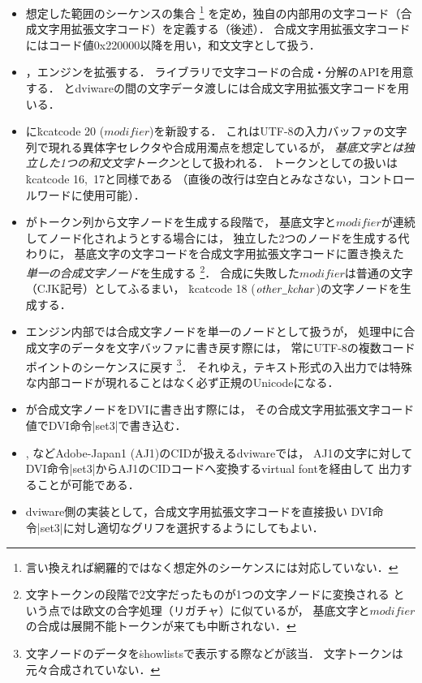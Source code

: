 \documentclass[a4paper,11pt,nomag,dvipdfmx]{jsarticle}
\def\_{\leavevmode\vrule width .45em height -.2ex depth .3ex\relax}
\begin{document}
\begin{itemize}
 \item 想定した範囲のシーケンスの集合%
   \footnote{言い換えれば網羅的ではなく想定外のシーケンスには対応していない．}%
   を定め，\upTeX 独自の内部用の文字コード（合成文字用拡張文字コード）を定義する（後述）．
   合成文字用拡張文字コードにはコード値0x220000以降を用い，和文文字として扱う．
 \item {}，\upTeX エンジンを拡張する．
   ライブラリで文字コードの合成・分解のAPIを用意する．
   \upTeX とdviwareの間の文字データ渡しには合成文字用拡張文字コードを用いる．
 \item \upTeX に\.{kcatcode} 20 ($\mathit{modifier}$)を新設する．
   これはUTF-8の入力バッファの文字列で現れる異体字セレクタや合成用濁点を想定しているが，
   \emph{基底文字とは独立した1つの和文文字トークン}として扱われる．
   トークンとしての扱いは\.{kcatcode} 16,~17と同様である
   （直後の改行は空白とみなさない，コントロールワードに使用可能）．
 \item \upTeX がトークン列から文字ノードを生成する段階で，
   基底文字と$\mathit{modifier}$が連続してノード化されようとする場合には，
   独立した2つのノードを生成する代わりに，
   基底文字の文字コードを合成文字用拡張文字コードに置き換えた
   \emph{単一の合成文字ノード}を生成する
   \footnote{文字トークンの段階で2文字だったものが1つの文字ノードに変換される
     という点では欧文の合字処理（リガチャ）に似ているが，
     基底文字と$\mathit{modifier}$の合成は展開不能トークンが来ても中断されない．}．
   合成に失敗した$\mathit{modifier}$は普通の文字（CJK記号）としてふるまい，
   \.{kcatcode} 18 ($\mathit{other\_kchar}$)の文字ノードを生成する．
 \item \upTeX エンジン内部では合成文字ノードを単一のノードとして扱うが，
   処理中に合成文字のデータを文字バッファに書き戻す際には，
   常にUTF-8の複数コードポイントのシーケンスに戻す
   \footnote{文字ノードのデータを\.{showlists}で表示する際などが該当．
     文字トークンは元々合成されていない．}．
   それゆえ，テキスト形式の入出力では特殊な内部コードが現れることはなく必ず正規のUnicodeになる．
 \item \upTeX が合成文字ノードをDVIに書き出す際には，
   その合成文字用拡張文字コード値でDVI命令|set3|で書き込む．
 \item {}, などAdobe-Japan1 (AJ1)のCIDが扱えるdviwareでは，
   AJ1の文字に対してDVI命令|set3|からAJ1のCIDコードへ変換するvirtual fontを経由して
   出力することが可能である．
 \item dviware側の実装として，合成文字用拡張文字コードを直接扱い
   DVI命令|set3|に対し適切なグリフを選択するようにしてもよい．
\end{itemize}
\end{document}
